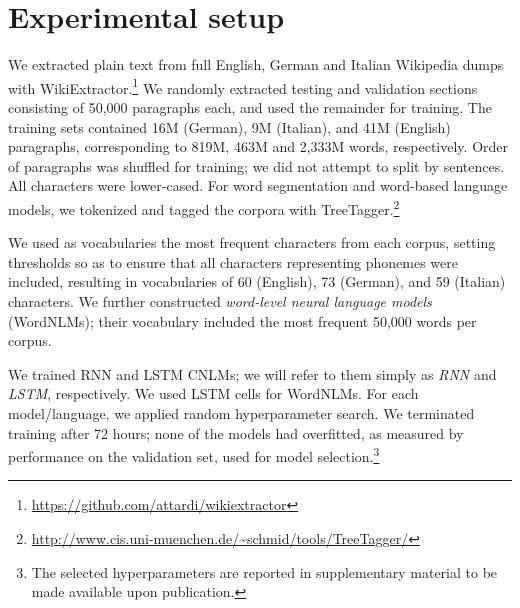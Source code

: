 \section{Experimental setup}
\label{sec:setup}

We extracted plain text from full English, German and Italian
Wikipedia dumps with
WikiExtractor.\footnote{\url{https://github.com/attardi/wikiextractor}}
We randomly extracted testing and validation sections consisting of
50,000 paragraphs each, and used the remainder for training. The
training sets contained 16M (German), 9M (Italian), and 41M (English)
paragraphs, corresponding to 819M, 463M and 2,333M words,
respectively. Order of paragraphs was shuffled for training; we did
not attempt to split by sentences. All characters were lower-cased.
For word segmentation and word-based language models, we tokenized and
tagged the corpora with
TreeTagger.\footnote{\url{http://www.cis.uni-muenchen.de/~schmid/tools/TreeTagger/}}

We used as vocabularies the most frequent characters from
each corpus, setting thresholds so as to ensure that all characters
representing phonemes were included, resulting in vocabularies of 60 (English), 73 (German), and 59 (Italian) characters.
We further constructed \emph{word-level neural language models} (WordNLMs); 
their vocabulary included the most frequent 50,000 words per corpus.

We trained RNN and LSTM CNLMs; we will refer to them simply as
\emph{RNN} and \emph{LSTM}, respectively. We used LSTM cells for
WordNLMs.  For each model/language, we applied random
hyperparameter search.  We terminated training after 72 hours; none of
the models had overfitted, as measured by performance on the
validation set, used for model selection.\footnote{The selected
  hyperparameters are reported in supplementary material to be made
  available upon publication.}

